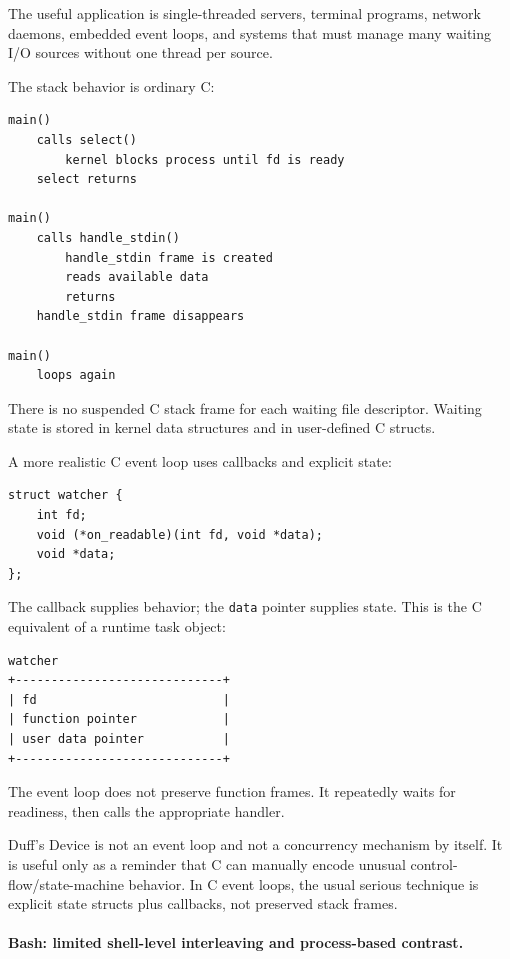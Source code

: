 The useful application is single-threaded servers, terminal programs, network daemons, embedded event loops, and systems that must manage many waiting I/O sources without one thread per source.

The stack behavior is ordinary C:

\begin{verbatim}
main()
    calls select()
        kernel blocks process until fd is ready
    select returns

main()
    calls handle_stdin()
        handle_stdin frame is created
        reads available data
        returns
    handle_stdin frame disappears

main()
    loops again
\end{verbatim}

There is no suspended C stack frame for each waiting file descriptor. Waiting state is stored in kernel data structures and in user-defined C structs.

A more realistic C event loop uses callbacks and explicit state:

\begin{verbatim}
struct watcher {
    int fd;
    void (*on_readable)(int fd, void *data);
    void *data;
};
\end{verbatim}

The callback supplies behavior; the \texttt{data} pointer supplies state. This is the C equivalent of a runtime task object:

\begin{verbatim}
watcher
+-----------------------------+
| fd                          |
| function pointer            |
| user data pointer           |
+-----------------------------+
\end{verbatim}

The event loop does not preserve function frames. It repeatedly waits for readiness, then calls the appropriate handler.

Duff's Device is not an event loop and not a concurrency mechanism by itself. It is useful only as a reminder that C can manually encode unusual control-flow/state-machine behavior. In C event loops, the usual serious technique is explicit state structs plus callbacks, not preserved stack frames.

\paragraph{Bash: limited shell-level interleaving and process-based contrast.}


